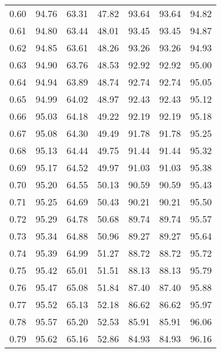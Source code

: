 \begin{tabular}{|c|c|c|c|c|c|c|}
      0.60 &     94.76 &     63.31 &      47.82 &   93.64 &      93.64 &         94.82 \\
      0.61 &     94.80 &     63.44 &      48.01 &   93.45 &      93.45 &         94.87 \\
      0.62 &     94.85 &     63.61 &      48.26 &   93.26 &      93.26 &         94.93 \\
      0.63 &     94.90 &     63.76 &      48.53 &   92.92 &      92.92 &         95.00 \\
      0.64 &     94.94 &     63.89 &      48.74 &   92.74 &      92.74 &         95.05 \\
      0.65 &     94.99 &     64.02 &      48.97 &   92.43 &      92.43 &         95.12 \\
      0.66 &     95.03 &     64.18 &      49.22 &   92.19 &      92.19 &         95.18 \\
      0.67 &     95.08 &     64.30 &      49.49 &   91.78 &      91.78 &         95.25 \\
      0.68 &     95.13 &     64.44 &      49.75 &   91.44 &      91.44 &         95.32 \\
      0.69 &     95.17 &     64.52 &      49.97 &   91.03 &      91.03 &         95.38 \\
      0.70 &     95.20 &     64.55 &      50.13 &   90.59 &      90.59 &         95.43 \\
      0.71 &     95.25 &     64.69 &      50.43 &   90.21 &      90.21 &         95.50 \\
      0.72 &     95.29 &     64.78 &      50.68 &   89.74 &      89.74 &         95.57 \\
      0.73 &     95.34 &     64.88 &      50.96 &   89.27 &      89.27 &         95.64 \\
      0.74 &     95.39 &     64.99 &      51.27 &   88.72 &      88.72 &         95.72 \\
      0.75 &     95.42 &     65.01 &      51.51 &   88.13 &      88.13 &         95.79 \\
      0.76 &     95.47 &     65.08 &      51.84 &   87.40 &      87.40 &         95.88 \\
      0.77 &     95.52 &     65.13 &      52.18 &   86.62 &      86.62 &         95.97 \\
      0.78 &     95.57 &     65.20 &      52.53 &   85.91 &      85.91 &         96.06 \\
      0.79 &     95.62 &     65.16 &      52.86 &   84.93 &      84.93 &         96.16 \\

\end{tabular}
